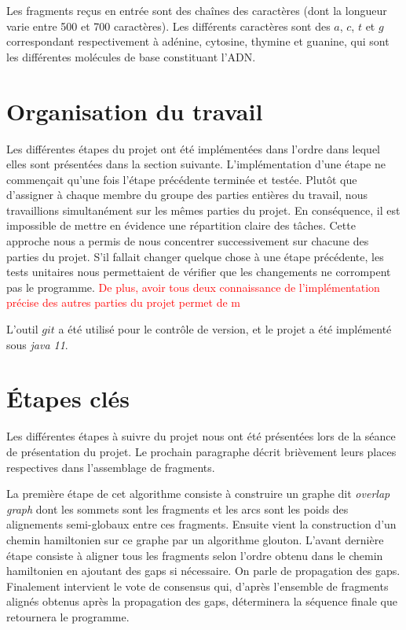 \documentclass{article}
\begin{document}
Les fragments reçus en entrée sont des chaînes des caractères (dont la longueur varie entre 500 et 700 caractères). Les différents caractères sont des $a$, $c$, $t$ et $g$ correspondant respectivement à adénine, cytosine, thymine et guanine, qui sont les différentes molécules de base constituant l'ADN.


\section{Organisation du travail}

Les différentes étapes du projet ont été implémentées dans l'ordre dans lequel elles sont présentées dans la section suivante. 
L'implémentation d'une étape ne commençait qu'une fois l'étape précédente terminée et testée. Plutôt que d'assigner à chaque membre du groupe des parties entières du travail, nous travaillions simultanément sur les mêmes parties du projet. En conséquence, il est impossible de mettre en évidence une répartition claire des tâches. Cette approche nous a permis de nous concentrer successivement sur chacune des parties du projet. S'il fallait changer quelque chose à une étape précédente, les tests unitaires nous permettaient de vérifier que les changements ne corrompent pas le programme. \textcolor{red}{ De plus, avoir tous deux connaissance de l'implémentation précise des autres parties du projet permet de m}

L'outil $git$ a été utilisé pour le contrôle de version, et le projet a été implémenté sous \textit{java 11}.


\newpage

\section{\'Etapes clés}

Les différentes étapes à suivre du projet nous ont été présentées lors de la séance de présentation du projet. Le prochain paragraphe décrit brièvement leurs places respectives dans l'assemblage de fragments.

La première étape de cet algorithme consiste à construire un graphe dit \textit{overlap graph} dont les sommets sont les fragments   et les arcs sont les poids des alignements semi-globaux entre ces fragments.
Ensuite vient la construction d'un chemin hamiltonien sur ce graphe par un algorithme glouton.
L'avant dernière étape consiste à aligner tous les fragments selon l'ordre obtenu dans le chemin hamiltonien en ajoutant des gaps si nécessaire. On parle de propagation des gaps.
Finalement intervient le vote de consensus qui, d'après l'ensemble de fragments alignés obtenus après la propagation des gaps, déterminera la séquence finale que retournera le programme.
\end{document}
